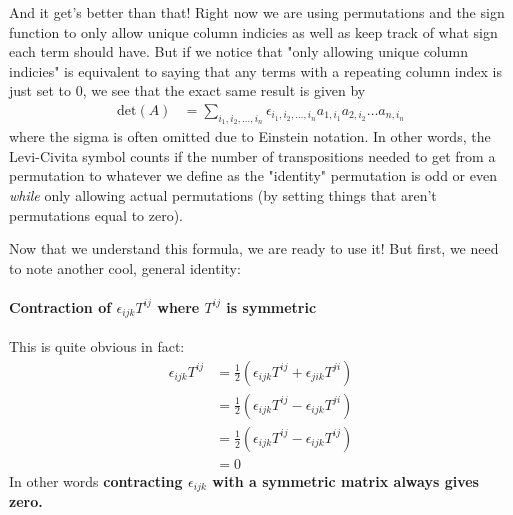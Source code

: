 And it get's better than that! Right now we are using permutations and the sign function to only allow unique column indicies as well as keep track of what sign each term should have. But if we notice that "only allowing unique column indicies" is equivalent to saying that any terms with a repeating column index is just set to 0, we see that the exact same result is given by \begin{align*}
    \text{det}(A) &= \sum_{i_1, i_2, \dots, i_n}  \epsilon_{i_1, i_2, \dots, i_n} a_{1, i_1}a_{2, i_2}\dots a_{n, i_n}
\end{align*}
where the sigma is often omitted due to Einstein notation. In other words, the Levi-Civita symbol counts if the number of transpositions needed to get from a permutation to whatever we define as the "identity" permutation is odd or even \textit{while} only allowing actual permutations (by setting things that aren't permutations equal to zero).

Now that we understand this formula, we are ready to use it! But first, we need to note another cool, general identity:
\paragraph{Contraction of \(\epsilon_{ijk} T^{ij} \) where \(T^{ij}\) is symmetric}
This is quite obvious in fact: \begin{align*}
    \epsilon _{ijk} T^{ij} &= \frac{1}{2}\left( \epsilon_{ijk}T^{ij} + \epsilon_{jik}T^{ji}\right) \\
    &= \frac{1}{2}\left( \epsilon_{ijk}T^{ij} - \epsilon_{ijk}T^{ji} \right) \\
    &= \frac{1}{2}\left( \epsilon_{ijk}T^{ij} - \epsilon_{ijk}T^{ij} \right)\\
    &= 0
\end{align*}
In other words \textbf{contracting \(\epsilon _{ijk}\) with a symmetric matrix always gives zero.}

